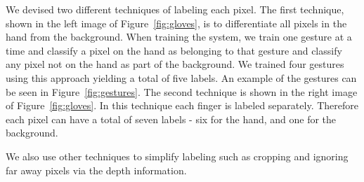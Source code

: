 We devised two different techniques of labeling each pixel. The first technique, shown in the left image of Figure~\ref{fig:gloves}, is to differentiate all pixels in the hand from the background. When training the system, we train one gesture at a time and classify a pixel on the hand as belonging to that gesture and classify any pixel not on the hand as part of the background. We trained four gestures using this approach yielding a total of five labels. An example of the gestures can be seen in Figure~\ref{fig:gestures}. The second technique is shown in the right image of Figure~\ref{fig:gloves}. In this technique each finger is labeled separately. Therefore each pixel can have a total of seven labels - six for the hand, and one for the background.

We also use other techniques to simplify labeling such as cropping and ignoring far away pixels via the depth information.
